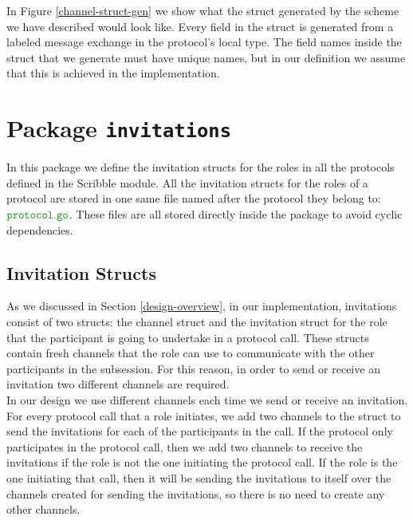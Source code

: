 \documentclass[12pt,twoside]{report}
\begin{document}
In Figure \ref{channel-struct-gen} we show what the struct generated by the scheme we have described would look like. Every field in the struct is generated from a labeled message exchange in the protocol's local type. The field names inside the struct that we generate must have unique names, but in our definition we assume that this is achieved in the implementation.

\section{Package \texttt{invitations}}\label{pkg-invitations}
In this package we define the invitation structs for the roles in all the protocols defined in the Scribble module. All the invitation structs for the roles of a protocol are stored in one same file named after the protocol they belong to: $\filename{protocol}$. These files are all stored directly inside the package to avoid cyclic dependencies.

\subsection{Invitation Structs}

As we discussed in Section \ref{design-overview}, in our implementation, invitations consist of two structs: the channel struct and the invitation struct for the role that the participant is going to undertake in a protocol call. These structs contain fresh channels that the role can use to communicate with the other participants in the subsession. For this reason, in order to send or receive an invitation two different channels are required.\\

In our design we use different channels each time we send or receive an invitation. For every protocol call that a role initiates, we add two channels to the struct to send the invitations for each of the participants in the call. If the protocol only participates in the protocol call, then we add two channels to receive the invitations if the role is not the one initiating the protocol call. If the role is the one initiating that call, then it will be sending the invitations to itself over the channels created for sending the invitations, so there is no need to create any other channels.\\
\end{document}
